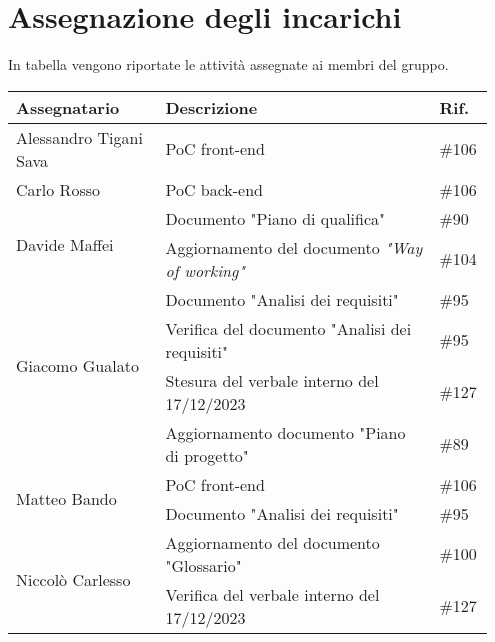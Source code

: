 \section{Assegnazione degli incarichi}
In tabella vengono riportate le attività assegnate ai membri del gruppo.
\begin{center}
	{
		\renewcommand{\arraystretch}{1.5}
		\begin{tabular}{p{0.30\linewidth}|p{0.55\linewidth}|p{0.10\linewidth}}
			\textbf{Assegnatario}             & \textbf{Descrizione}                                  & \textbf{Rif.} \\
			\hline
			Alessandro Tigani Sava            & PoC front-end                                         & \#106         \\
			\hline
			Carlo Rosso                       & PoC back-end                                          & \#106         \\
			\hline
			\multirow{2}{*}{Davide Maffei}    & Documento "Piano di qualifica"                        & \#90          \\
			\cline{2-3}
			                                  & Aggiornamento del documento \textit{"Way of working"} & \#104         \\
			\cline{2-3}
			                                  & Documento "Analisi dei requisiti"                     & \#95          \\
			\hline
			\multirow{2}{*}{Giacomo Gualato}  & Verifica del documento "Analisi dei requisiti"        & \#95          \\
			\cline{2-3}
			                                  & Stesura del verbale interno del 17/12/2023            & \#127         \\
			\cline{2-3}
			                                  & Aggiornamento documento "Piano di progetto"           & \#89          \\
			\hline
			\multirow{2}{*}{Matteo Bando}     & PoC front-end                                         & \#106         \\
			\cline{2-3}
			                                  & Documento "Analisi dei requisiti"                     & \#95          \\
			\hline
			\multirow{2}{*}{Niccolò Carlesso} & Aggiornamento del documento "Glossario"               & \#100         \\
			\cline{2-3}
			                                  & Verifica del verbale interno del 17/12/2023           & \#127         \\
			\hline
		\end{tabular}
	}
\end{center}
